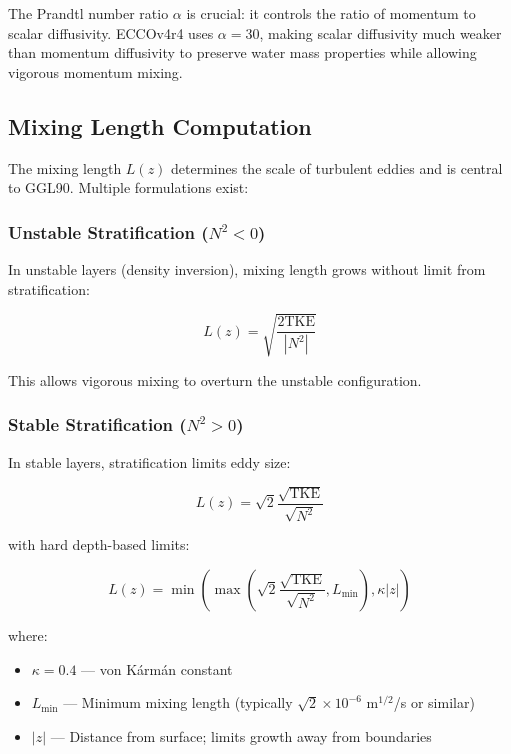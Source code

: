\documentclass[11pt, a4paper]{article}
\begin{document}
The Prandtl number ratio $\alpha$ is crucial: it controls the ratio of momentum to scalar diffusivity. ECCOv4r4 uses $\alpha = 30$, making scalar diffusivity much weaker than momentum diffusivity to preserve water mass properties while allowing vigorous momentum mixing.

\subsection{Mixing Length Computation}

The mixing length $L(z)$ determines the scale of turbulent eddies and is central to GGL90. Multiple formulations exist:

\subsubsection{Unstable Stratification ($N^2 < 0$)}

In unstable layers (density inversion), mixing length grows without limit from stratification:

\begin{equation}
L(z) = \sqrt{\frac{2\text{TKE}}{|N^2|}}
\end{equation}

This allows vigorous mixing to overturn the unstable configuration.

\subsubsection{Stable Stratification ($N^2 > 0$)}

In stable layers, stratification limits eddy size:

\begin{equation}
L(z) = \sqrt{2} \frac{\sqrt{\text{TKE}}}{\sqrt{N^2}}
\end{equation}

with hard depth-based limits:

\begin{equation}
L(z) = \min\left(\max\left(\sqrt{2}\frac{\sqrt{\text{TKE}}}{\sqrt{N^2}}, L_{\min}\right), \kappa |z|\right)
\end{equation}

where:

\begin{itemize}
    \item $\kappa = 0.4$ — von Kármán constant
    \item $L_{\min}$ — Minimum mixing length (typically $\sqrt{2} \times 10^{-6}$ m$^{1/2}$/s or similar)
    \item $|z|$ — Distance from surface; limits growth away from boundaries
\end{itemize}
\end{document}
